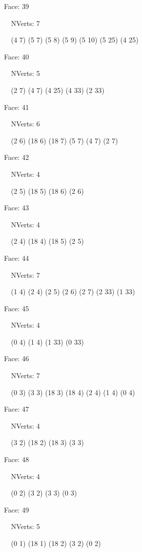 \documentclass{article}
\begin{document}
{\footnotesize 

Face: 39

\   \    NVerts: 7

 \   \   (4 7) (5 7) (5 8) (5 9) (5 10) (5 25) (4 25)}

{\footnotesize 

Face: 40

\   \    NVerts: 5

 \   \   (2 7) (4 7) (4 25) (4 33) (2 33)}

{\footnotesize 

Face: 41

\   \    NVerts: 6

 \   \   (2 6) (18 6) (18 7) (5 7) (4 7) (2 7)}

{\footnotesize 

Face: 42

\   \    NVerts: 4

 \   \   (2 5) (18 5) (18 6) (2 6)}

{\footnotesize 

Face: 43

\   \    NVerts: 4

 \   \   (2 4) (18 4) (18 5) (2 5)}

{\footnotesize 

Face: 44

\   \    NVerts: 7

 \   \   (1 4) (2 4) (2 5) (2 6) (2 7) (2 33) (1 33)}

{\footnotesize 

Face: 45

\   \    NVerts: 4

 \   \   (0 4) (1 4) (1 33) (0 33)}

{\footnotesize 

Face: 46

\   \    NVerts: 7

 \   \   (0 3) (3 3) (18 3) (18 4) (2 4) (1 4) (0 4)}

{\footnotesize 

Face: 47

\   \    NVerts: 4

 \   \   (3 2) (18 2) (18 3) (3 3)}

{\footnotesize 

Face: 48

\   \    NVerts: 4

 \   \   (0 2) (3 2) (3 3) (0 3)}

{\footnotesize 

Face: 49

\   \    NVerts: 5

 \   \   (0 1) (18 1) (18 2) (3 2) (0 2)}
\end{document}
